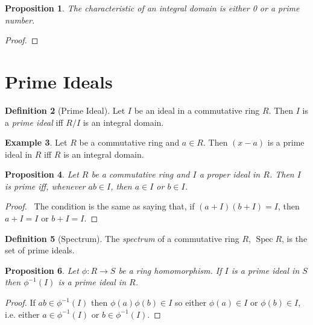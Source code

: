 \documentclass{book}
\let\qed\relax
\newtheorem{prop}{Proposition}[chapter]
\theoremstyle{definition}
\newtheorem{df}[prop]{Definition}
\newtheorem{ex}[prop]{Example}
\newcommand{\inv}[1]{\ensuremath{{#1}^{-1}}}
\newcommand{\Spec}{\ensuremath{\operatorname{Spec}}}
\begin{document}
\begin{prop}
The characteristic of an integral domain is either 0 or a prime number.
\end{prop}

\begin{proof}
\pf
{}
\qed
\end{proof}

\section{Prime Ideals}

\begin{df}[Prime Ideal]
Let $I$ be an ideal in a commutative ring $R$. Then $I$ is a \emph{prime ideal} iff $R/I$ is an integral domain.
\end{df}

\begin{ex}
Let $R$ be a commutative ring and $a \in R$. Then $(x-a)$ is a prime ideal in $R$ iff $R$ is an integral domain.
\end{ex}

\begin{prop}
Let $R$ be a commutative ring and $I$ a proper ideal in $R$. Then $I$ is prime iff, whenever $ab \in I$, then $a \in I$ or $b \in I$.
\end{prop}

\begin{proof}
\pf\ The condition is the same as saying that, if $(a+I)(b+I) = I$, then $a+I = I$ or $b+I = I$. \qed
\end{proof}

\begin{df}[Spectrum]
The \emph{spectrum} of a commutative ring $R$, $\Spec R$, is the set of prime ideals.
\end{df}

\begin{prop}
Let $\phi : R \rightarrow S$ be a ring homomorphism. If $I$ is a prime ideal in $S$ then $\inv{\phi}(I)$ is a prime ideal in $R$.
\end{prop}

\begin{proof}
\pf
If $ab \in \inv{\phi}(I)$ then $\phi(a)\phi(b) \in I$ so either $\phi(a) \in I$ or $\phi(b) \in I$, i.e. either $a \in \inv{\phi}(I)$ or $b \in \inv{\phi}(I)$. \qed
\end{proof}
\end{document}
